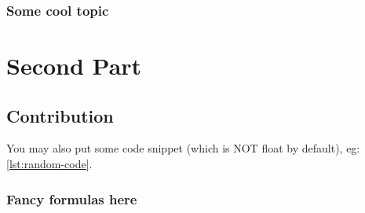 \documentclass[12pt,a4paper,openright,twoside]{book}
\begin{document}
\section{Some cool topic}

\part{Second Part}

\chapter{Contribution}

You may also put some code snippet (which is NOT float by default), eg: \cref{lst:random-code}.



\section{Fancy formulas here}


\backmatter

\part*{}

\nocite{*} %


\end{document}
